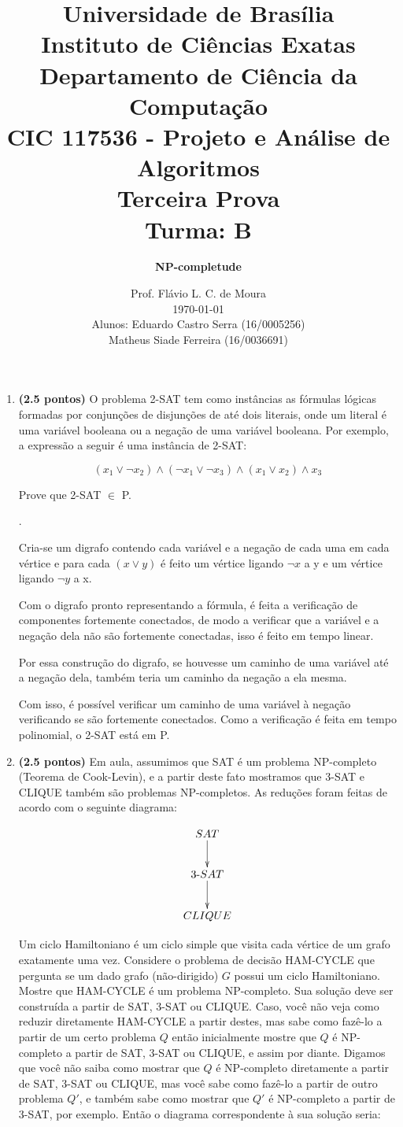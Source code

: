 \documentclass[12pt]{article}
\title{{\large Universidade de Brasília \\ Instituto de Ciências Exatas \\
Departamento de Ciência da Computação} \\[1cm]
CIC 117536 - Projeto e Análise de Algoritmos \\[.5cm]  Terceira Prova \\[.5cm] Turma: B}
\author{{\bf NP-completude}}
\date{Prof. Flávio L. C. de Moura \\[.5cm] \today \\ [.5cm]
Alunos: Eduardo Castro Serra (16/0005256) \\ Matheus Siade Ferreira (16/0036691)
}
\newcommand{\resposta}[1]{ \noindent {\bf Solução}.{\color{blue} #1}}
\begin{document}
\maketitle

\begin{enumerate}
\item {\bf (2.5 pontos)} O problema 2-SAT tem como instâncias as
  fórmulas lógicas formadas por conjunções de disjunções de até dois
  literais, onde um literal é uma variável booleana ou a negação de
  uma variável booleana. Por exemplo, a expressão a seguir é uma
  instância de 2-SAT:

  $$(x_1\lor \neg x_2)\land (\neg x_1 \lor \neg x_3) \land (x_1 \lor x_2) \land x_3$$

  Prove que 2-SAT $\in$ P.

 
  \resposta{
    Cria-se um digrafo contendo cada variável e a negação de cada uma em cada vértice e para cada ${(x\lor y)}$ é feito um vértice ligando ${\neg x}$ a y e um vértice ligando ${\neg y}$ a x.

	Com o digrafo pronto representando a fórmula, é feita a verificação de componentes fortemente conectados, de modo a verificar que a variável e a negação dela não são fortemente conectadas, isso é feito em tempo linear.

	Por essa construção do digrafo, se houvesse um caminho de uma variável até a negação dela, também teria um caminho da negação a ela mesma.

	Com isso, é possível verificar um caminho de uma variável à negação verificando se são fortemente conectados. Como a verificação é feita em tempo polinomial, o 2-SAT está em P.
  }
  
\item {\bf (2.5 pontos)} Em aula, assumimos que SAT é um problema
  NP-completo (Teorema de Cook-Levin), e a partir deste fato mostramos
  que 3-SAT e CLIQUE também são problemas NP-completos. As reduções
  foram feitas de acordo com o seguinte diagrama:

  $$\xymatrix{
    SAT \ar[d] \\
    3\mbox{-}SAT \ar[d] \\
    CLIQUE 
  }$$
  
  Um ciclo Hamiltoniano é um ciclo simple que visita cada vértice de
  um grafo exatamente uma vez. Considere o problema de decisão
  HAM-CYCLE que pergunta se um dado grafo (não-dirigido) $G$ possui um
  ciclo Hamiltoniano. Mostre que HAM-CYCLE é um problema
  NP-completo. Sua solução deve ser construída a partir de SAT, 3-SAT
  ou CLIQUE. Caso, você não veja como reduzir diretamente HAM-CYCLE a
  partir destes, mas sabe como fazê-lo a partir de um certo problema
  $Q$ então inicialmente mostre que $Q$ é NP-completo a partir de SAT,
  3-SAT ou CLIQUE, e assim por diante. Digamos que você não saiba como
  mostrar que $Q$ é NP-completo diretamente a partir de SAT, 3-SAT ou
  CLIQUE, mas você sabe como fazê-lo a partir de outro problema $Q'$,
  e também sabe como mostrar que $Q'$ é NP-completo a partir de 3-SAT,
  por exemplo. Então o diagrama correspondente à sua solução seria:


\end{enumerate}
\end{document}
